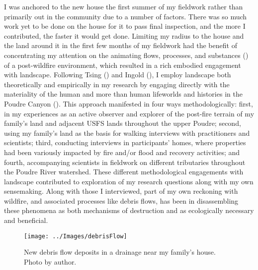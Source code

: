\documentclass[
]{article}
\begin{document}
I was anchored to the new house the first summer of my fieldwork rather than primarily out in the community due to a number of factors. There was so much work yet to be done on the house for it to pass final inspection, and the more I contributed, the faster it would get done. Limiting my radius to the house and the land around it in the first few months of my fieldwork had the benefit of concentrating my attention on the animating flows, processes, and substances () of a post-wildfire environment, which resulted in a rich embodied engagement with landscape. Following Tsing () and Ingold (), I employ landscape both theoretically and empirically in my research by engaging directly with the materiality of the human and more than human lifeworlds and histories in the Poudre Canyon (). This approach manifested in four ways methodologically: first, in my experiences as an active observer and explorer of the post-fire terrain of my family's land and adjacent USFS lands throughout the upper Poudre; second, using my family's land as the basis for walking interviews with practitioners and scientists; third, conducting interviews in participants' homes, where properties had been variously impacted by fire and/or flood and recovery activities; and fourth, accompanying scientists in fieldwork on different tributaries throughout the Poudre River watershed. These different methodological engagements with landscape contributed to exploration of my research questions along with my own sensemaking. Along with those I interviewed, part of my own reckoning with wildfire, and associated processes like debris flows, has been in disassembling these phenomena as both mechanisms of destruction and as ecologically necessary and beneficial.

\begin{figure}
\texttt{[image: ../Images/debrisFlow]} \caption[New debris flow deposits]{New debris flow deposits in a drainage near my family's house. Photo by author.}\label{fig:figureTitle2}
\end{figure}
\end{document}

